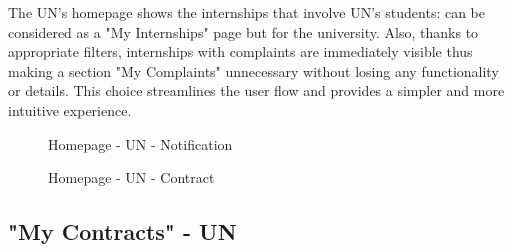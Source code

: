 \par The UN's homepage shows the internships that involve UN's students: can be considered as a "My Internships" page
but for the university. Also, thanks to appropriate filters, internships with complaints are immediately visible thus
making a section "My Complaints" unnecessary without losing any functionality or details. This choice streamlines the
user flow and provides a simpler and more intuitive experience.

\begin{figure}[H]
    \centering
    \caption{Homepage - UN - Notification}
    \label{fig:homepage-un-notification}
\end{figure}

\begin{figure}[H]
    \centering
    \caption{Homepage - UN - Contract}
    \label{fig:homepage-un-contract}
\end{figure}

\subsection{"My Contracts" - UN}
\label{subsec:my-contracts-un}%


